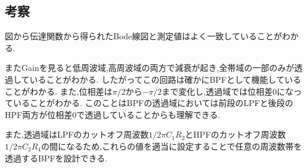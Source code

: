 \subsection{考察}
図から伝達関数から得られたBode線図と測定値はよく一致していることがわかる.

またGainを見ると低周波域,高周波域の両方で減衰が起き,全帯域の一部のみが透過していることがわかる.
したがってこの回路は確かにBPFとして機能していることがわかる.
また,位相差は$\pi/2$から$-\pi/2$まで変化し,透過域では位相差0になっていることがわかる.
このことはBPFの透過域においては前段のLPFと後段のHPF両方が位相差0で透過していることからも理解できる.

また,透過域はLPFのカットオフ周波数$1/2\pi C_1R_2$とHPFのカットオフ周波数$1/2\pi C_2R_4$の間になるため,これらの値を適当に設定することで任意の周波数帯を透過するBPFを設計できる.